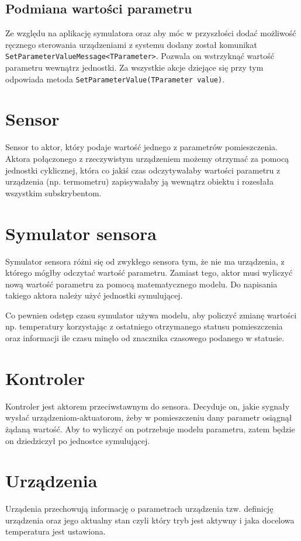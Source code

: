 \subsection{Podmiana wartości parametru}
Ze względu na aplikację symulatora oraz aby móc w przyszłości dodać możliwość ręcznego sterowania urządzeniami z systemu dodany został komunikat \lstinline{SetParameterValueMessage<TParameter>}. Pozwala on wstrzyknąć wartość parametru wewnątrz jednostki. Za wszystkie akcje dziejące się przy tym odpowiada metoda \lstinline{SetParameterValue(TParameter value)}.

\section{Sensor}
Sensor to aktor, który podaje wartość jednego z parametrów pomieszczenia. Aktora połączonego z rzeczywistym urządzeniem możemy otrzymać za pomocą jednostki cyklicznej, która co jakiś czas odczytywałaby wartości parametru z urządzenia (np. termometru) zapisywałaby ją wewnątrz obiektu i rozesłała wszystkim subskrybentom.  

\section{Symulator sensora}
Symulator sensora różni się od zwykłego sensora tym, że nie ma urządzenia, z którego mógłby odczytać wartość parametru. 
Zamiast tego, aktor musi wyliczyć nową wartość parametru za pomocą matematycznego modelu. Do napisania takiego aktora należy użyć jednostki symulującej.  

Co pewnien odstęp czasu symulator używa modelu, aby policzyć zmianę wartości np. temperatury korzystając z ostatniego otrzymanego statusu pomieszczenia oraz informacji ile czasu minęło od znacznika czasowego podanego w statusie.

\section{Kontroler}
Kontroler jest aktorem przeciwstawnym do sensora. Decyduje on, jakie sygnały wysłać urządzeniom-aktuatorom, żeby w pomieszczeniu dany parametr osiągnął żądaną wartość.
Aby to wyliczyć on potrzebuje modelu parametru, zatem będzie on dziedziczył po jednostce symulującej. 

\section{Urządzenia}
Urządenia przechowują informację o parametrach urządzenia tzw. definicję urządzenia oraz jego aktualny stan czyli który tryb jest aktywny i jaka docelowa temperatura jest ustawiona. 
